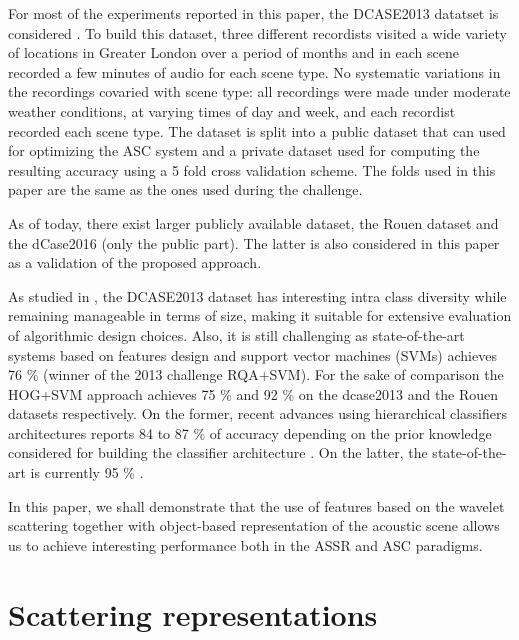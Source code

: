 \documentclass[journal]{IEEEtran}
\begin{document}

For most of the experiments reported in this paper, the DCASE2013 datatset is considered \cite{giannoulis2013database, 7100934}. To build this dataset, three different recordists visited a wide variety of locations in Greater London over
a period of months and in each
scene recorded a few minutes of audio for each scene type. No
systematic variations in the recordings covaried with scene
type: all recordings were made under moderate weather conditions, at varying times of day and week, and each recordist recorded each scene type.
The dataset is split into a public dataset that can used for optimizing the ASC system and a private dataset used for computing the resulting accuracy using a 5 fold cross validation scheme. The folds used in this paper are the same as the ones used during the challenge.

As of today, there exist larger publicly available dataset, the
Rouen dataset \cite{rakotomamonjy2015histogram} and the dCase2016 \cite{Mesaros2016_EUSIPCO} (only the public part). The latter is also considered in this paper as a validation of the proposed approach.

As studied in \cite{lagrange:hal-01082501}, the DCASE2013 dataset has interesting intra class diversity while remaining manageable in terms of size, making it suitable for extensive evaluation of algorithmic design choices. Also, it is still challenging as state-of-the-art systems based on features design and support vector machines (SVMs) achieves 76 \% \cite{roma2013} (winner of the 2013 challenge RQA+SVM). For the sake of comparison the HOG+SVM approach \cite{rakotomamonjy2015histogram} achieves 75 \% and 92 \% on the dcase2013 and the Rouen datasets respectively. On the former, recent advances using hierarchical classifiers architectures reports 84 to 87 \% of accuracy depending on the prior knowledge considered for building the classifier architecture \cite{phan2016label}. On the latter, the state-of-the-art is currently 95 \% \cite{bisot2016acoustic}. 

In this paper, we shall demonstrate that the use of features based on the wavelet scattering together with object-based representation of the acoustic scene allows us to achieve interesting performance both in the ASSR and ASC paradigms.

\section{Scattering representations \label{sec:scattering}}
\end{document}
